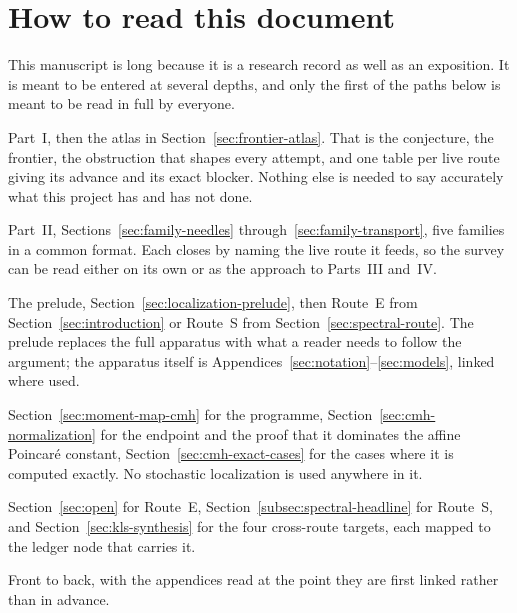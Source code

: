 \documentclass[../../main.tex]{subfiles}
\begin{document}
\section*{How to read this document}
\label{sec:reading-paths}

This manuscript is long because it is a research record as well as an exposition. It is
meant to be entered at several depths, and only the first of the paths below is meant to
be read in full by everyone.

\begin{description}[leftmargin=0pt,style=nextline]
  \item[A twenty-minute overview.] Part~I, then the atlas in
  Section~\ref{sec:frontier-atlas}. That is the conjecture, the frontier, the obstruction
  that shapes every attempt, and one table per live route giving its advance and its exact
  blocker. Nothing else is needed to say accurately what this project has and has not done.

  \item[The methods of the literature.] Part~II, Sections~\ref{sec:family-needles}
  through~\ref{sec:family-transport}, five families in a common format. Each closes by
  naming the live route it feeds, so the survey can be read either on its own or as the
  approach to Parts~III and~IV.

  \item[The stochastic-localization routes.] The prelude,
  Section~\ref{sec:localization-prelude}, then Route~E from
  Section~\ref{sec:introduction} or Route~S from Section~\ref{sec:spectral-route}. The
  prelude replaces the full apparatus with what a reader needs to follow the argument; the
  apparatus itself is Appendices~\ref{sec:notation}--\ref{sec:models}, linked where used.

  \item[The deterministic moment-map route.] Section~\ref{sec:moment-map-cmh} for the
  programme, Section~\ref{sec:cmh-normalization} for the endpoint and the proof that it
  dominates the affine Poincar\'e constant, Section~\ref{sec:cmh-exact-cases} for the cases
  where it is computed exactly. No stochastic localization is used anywhere in it.

  \item[The open bottlenecks, as a list.] Section~\ref{sec:open} for Route~E,
  Section~\ref{subsec:spectral-headline} for Route~S, and
  Section~\ref{sec:kls-synthesis} for the four cross-route targets, each mapped to the
  ledger node that carries it.

  \item[The complete technical development.] Front to back, with the appendices read at
  the point they are first linked rather than in advance.
\end{description}
\end{document}
